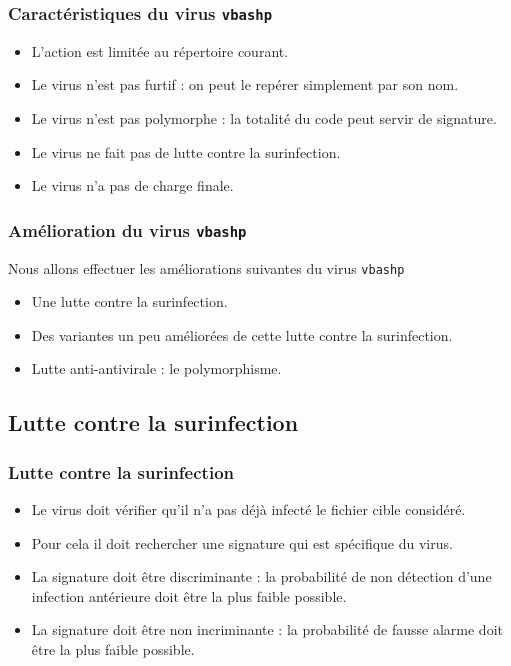 \documentclass{beamer}
\begin{document}
\begin{frame}
\frametitle{Caractéristiques du virus \texttt{vbashp}}
\begin{itemize}
\item L'action est { \color{blue} limitée au répertoire courant.}
\item Le virus n'est { \color{blue}pas furtif} : on peut le repérer simplement par son nom.
\item Le virus n'est { \color{blue} pas polymorphe} : la totalité du code peut servir de signature.
\item Le virus ne fait { \color{blue}pas de lutte contre la surinfection}.
\item Le virus n'a  { \color{blue}pas de charge finale}.
\end{itemize}
\end{frame}


\begin{frame}
\frametitle{Amélioration du virus \texttt{vbashp}}%

Nous allons effectuer les améliorations suivantes du virus \texttt{vbashp} %

\begin{itemize}
\item Une lutte contre la surinfection.
\item Des variantes un peu améliorées de cette lutte contre la surinfection.
\item Lutte anti-antivirale : le polymorphisme.
\end{itemize}
\end{frame}



\subsection{Lutte contre la surinfection}

\begin{frame}
\frametitle{Lutte contre la surinfection}
\begin{itemize}
\item Le virus doit vérifier qu'il n'a pas déjà infecté le fichier cible considéré.
\item Pour cela il doit rechercher une signature qui est spécifique du virus.
\item La signature doit être discriminante : la probabilité de non détection d'une infection antérieure doit être la plus faible possible.
\item La signature doit être non incriminante : la probabilité de fausse alarme doit être la plus faible possible.
\end{itemize}
\end{frame}
\end{document}
